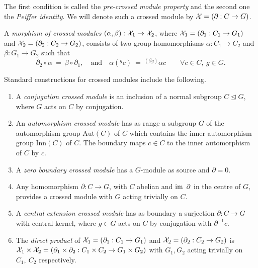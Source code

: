 \documentclass[a4paper,11pt]{article}
\theoremstyle{plain}
\theoremstyle{definition}
\begin{document}
The first condition is called the \emph{pre-crossed module property} 
and the second one the \emph{Peiffer identity}. 
We will denote such a crossed module by $\mathcal{X}=(\partial:C\rightarrow G)$.

A \emph{morphism of crossed modules} 
$(\alpha ,\beta ):\mathcal{X}_{1}\rightarrow \mathcal{X}_{2}$, 
where $\mathcal{X}_{1} = (\partial_{1} : C_{1} \rightarrow G_{1})$ 
and   $\mathcal{X}_{2} = (\partial_{2} : C_{2} \rightarrow G_{2})$, 
consists of two group homomorphisms $\alpha : C_{1}\rightarrow C_{2}$
and $\beta : G_{1}\rightarrow G_{2}$ such that 
$$ 
\partial_{2}\circ\alpha ~=~ \beta\circ\partial_{1}, 
\quad \mbox{and} \quad 
\alpha(^{g}c) ~=~ ^{(\beta g)}\alpha c 
\qquad
\forall c\in C,~ g\in G.
$$

Standard constructions for crossed modules include the following. 
\begin{enumerate}
\item 
A \emph{conjugation crossed module}  
is an inclusion of a normal subgroup $C \unlhd G$, 
where $G$ acts on $C$ by conjugation.
\item 
An \emph{automorphism crossed module}  
has as range a subgroup $G$ of the automorphism group $\mbox{Aut}(C)$ of $C$ 
which contains the inner automorphism group $\mbox{Inn}(C)$ of $C$. 
The boundary maps $c \in C$ to the inner automorphism of $C$ by $c$.
\item 
A \emph{zero boundary crossed module}  
has a $G$-module as source and $\partial = 0$.
\item 
Any homomorphism $\partial : C \to G$, with $C$ abelian 
and $\mathrm{im}\, ~\partial$ in the centre of $G$, 
provides a crossed module with $G$ acting trivially on $C$.
\item 
A \emph{central extension crossed module} 
has as boundary a surjection $\partial : C \to G$ with central kernel, 
where $g \in G$ acts on $C$ by conjugation with $\partial^{-1}c$.
\item 
The \emph{direct product} of  
$\mathcal{X}_1 = (\partial_1 : C_1 \to G_1)$ and $\mathcal{X}_2 = (\partial_2 : C_2 \to G_2)$ 
is $\mathcal{X}_1 \times \mathcal{X}_2 
= (\partial_1 \times \partial_2 : C_1 \times C_2 \to G_1 \times G_2)$ 
with $G_1, G_2$ acting trivially on $C_1,\ C_2$ respectively.
\end{enumerate}
\end{document}
